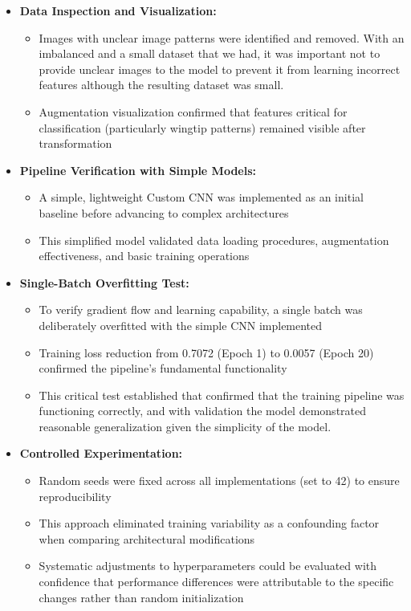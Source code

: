 \documentclass[a4paper,12pt]{report}
\begin{document}
\begin{itemize}
    \item \textbf{Data Inspection and Visualization:}
    \begin{itemize}
        \item Images with unclear image patterns were identified and removed. With an imbalanced and a small dataset that we had, it was important not to provide unclear images to the model to prevent it from learning incorrect features although the resulting dataset was small.
        \item Augmentation visualization confirmed that features critical for classification (particularly wingtip patterns) remained visible after transformation
    \end{itemize}
    
    \item \textbf{Pipeline Verification with Simple Models:}
    \begin{itemize}
        \item A simple, lightweight Custom CNN was implemented as an initial baseline before advancing to complex architectures
        \item This simplified model validated data loading procedures, augmentation effectiveness, and basic training operations
    \end{itemize}
    
    \item \textbf{Single-Batch Overfitting Test:}
    \begin{itemize}
        \item To verify gradient flow and learning capability, a single batch was deliberately overfitted with the simple CNN implemented
        \item Training loss reduction from 0.7072 (Epoch 1) to 0.0057 (Epoch 20) confirmed the pipeline's fundamental functionality
        \item This critical test established that confirmed that the training pipeline was functioning correctly, and with validation the model demonstrated reasonable generalization given the simplicity of the model.
    \end{itemize}
    
    \item \textbf{Controlled Experimentation:}
    \begin{itemize}
        \item Random seeds were fixed across all implementations (set to 42) to ensure reproducibility
        \item This approach eliminated training variability as a confounding factor when comparing architectural modifications
        \item Systematic adjustments to hyperparameters could be evaluated with confidence that performance differences were attributable to the specific changes rather than random initialization
    \end{itemize}
    

\end{itemize}
\end{document}
